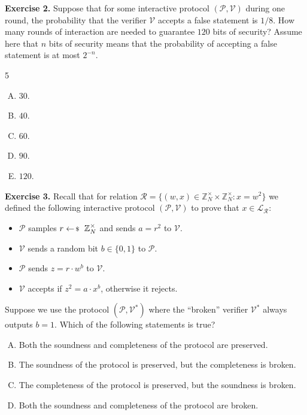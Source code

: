 \documentclass[../lecture-notes-148x210.tex]{subfiles}
\begin{document}
\textbf{Exercise 2.} Suppose that for some interactive protocol $(\mathcal{P},
\mathcal{V})$ during one round, the probability that the verifier $\mathcal{V}$
accepts a false statement is $1/8$. How many rounds of interaction are needed to
guarantee $120$ bits of security? Assume here that $n$ bits of security means
that the probability of accepting a false statement is at most $2^{-n}$.
\begin{multicols}{5}    
    \begin{enumerate}[(A)]
        \item $30$.
        \item $40$.
        \item $60$.
        \item $90$.
        \item $120$.
    \end{enumerate}
\end{multicols}

\textbf{Exercise 3.} Recall that for relation $\mathcal{R} = \{(w,x) \in
\mathbb{Z}_N^{\times} \times \mathbb{Z}_N^{\times}: x = w^2\}$ we defined the
following interactive protocol $(\mathcal{P}, \mathcal{V})$ to prove that $x \in
\mathcal{L}_{\mathcal{R}}$:
\begin{itemize}
    \item $\mathcal{P}$ samples $r \leftarrowS \mathbb{Z}_N^{\times}$ and sends $a = r^2$ to $\mathcal{V}$.
    \item $\mathcal{V}$ sends a random bit $b \in \{0,1\}$ to $\mathcal{P}$.
    \item $\mathcal{P}$ sends $z = r \cdot w^b$ to $\mathcal{V}$.
    \item $\mathcal{V}$ accepts if $z^2 = a \cdot x^b$, otherwise it rejects.
\end{itemize}

Suppose we use the protocol $(\mathcal{P}, \mathcal{V}^*)$ where the ``broken'' verifier $\mathcal{V}^*$ always outputs $b=1$. Which of the following statements is true?
\begin{enumerate}[(A)]
    \item Both the soundness and completeness of the protocol are preserved.
    \item The soundness of the protocol is preserved, but the completeness is broken.
    \item The completeness of the protocol is preserved, but the soundness is broken.
    \item Both the soundness and completeness of the protocol are broken.
\end{enumerate}
\end{document}
